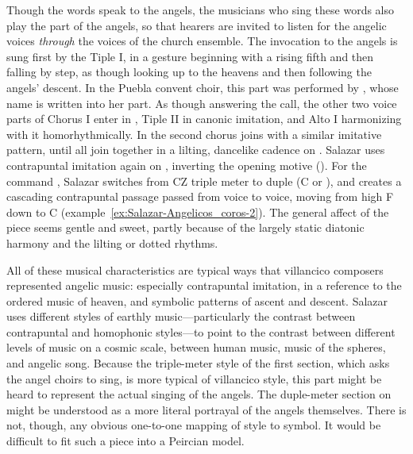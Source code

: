 Though the words speak to the angels, the musicians who sing these words also play the part of the angels, so that hearers are invited to listen for the angelic voices \emph{through} the voices of the church ensemble. 
The invocation to the angels is sung first by the Tiple I, in a gesture beginning with a rising fifth and then falling by step, as though looking up to the heavens and then following the angels' descent.
In the Puebla convent choir, this part was performed by , whose name is written into her part.
As though answering the call, the other two voice parts of Chorus I enter in , Tiple II in canonic imitation, and Alto I harmonizing with it homorhythmically. 
In  the second chorus joins with a similar imitative pattern, until all join together in a lilting, dancelike cadence on .
Salazar uses contrapuntal imitation again on , inverting the opening motive ().
For the command  , Salazar switches from CZ triple meter to duple (C or ), and creates a cascading contrapuntal passage passed from voice to voice, moving from high F down to C (example~\ref{ex:Salazar-Angelicos_coros-2}).
The general affect of the piece seems gentle and sweet, partly because of the largely static diatonic harmony and the lilting or dotted rhythms.

% 
% 

All of these musical characteristics are typical ways that villancico composers represented angelic music: especially contrapuntal imitation, in a reference to the ordered music of heaven, and symbolic patterns of ascent and descent.
Salazar uses different styles of earthly music---particularly the contrast between contrapuntal and homophonic styles---to point to the contrast between different levels of music on a cosmic scale, between human music, music of the spheres, and angelic song.
Because the triple-meter style of the first section, which asks the angel choirs to sing, is more typical of villancico style, this part might be heard to represent the actual singing of the angels.
The duple-meter section on  might be understood as a more literal portrayal of the angels themselves.
There is not, though, any obvious one-to-one mapping of style to symbol.
It would be difficult to fit such a piece into a Peircian model.

